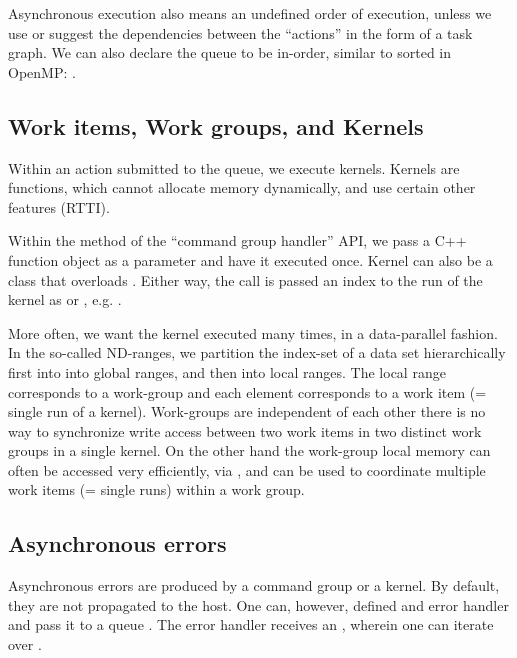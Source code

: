 Asynchronous execution also means an undefined order of execution, 
unless we use  or suggest the dependencies between the ``actions'' in the form of a task graph.
We can also declare the queue to be in-order, similar to sorted in OpenMP:
.


 \subsection{Work items, Work groups, and Kernels}

Within an action submitted to the queue, we execute kernels.
 Kernels are  functions, which cannot allocate memory dynamically, and use certain other features (RTTI). 

Within the  method of the ``command group handler'' API, 
we pass a C++ function object as a parameter and have it executed once. 
Kernel can also be a class that overloads .
Either way, the call is passed an index to the run of the kernel as  or , e.g. .

More often, we want the kernel executed many times, in a data-parallel fashion. 
In the so-called ND-ranges, we partition the index-set of a data set hierarchically first into into global ranges, and then into local ranges. 
The local range corresponds to a work-group and each element corresponds to a work item (= single run of a kernel). 
Work-groups are independent of each other there is no way to synchronize write access between two work items in two distinct work groups in a single kernel. 
On the other hand the work-group local memory can often be accessed very efficiently, via , and can be used to coordinate multiple work items (= single runs) within a work group.

\subsection{Asynchronous errors}

Asynchronous errors are produced by a command group or a kernel. By default, they are not propagated to the host. One can, however, defined and error handler and pass it to a queue .
The error handler receives an , wherein one can iterate over .

